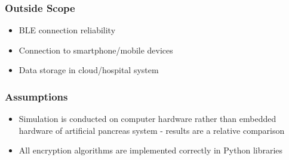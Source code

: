 \documentclass[conference]{IEEEtran}
\begin{document}
\subsubsection{Outside Scope}
\begin{itemize}
    \item BLE connection reliability
    \item Connection to smartphone/mobile devices
    \item Data storage in cloud/hospital system
\end{itemize}

\subsubsection{Assumptions}
\begin{itemize}
    \item Simulation is conducted on computer hardware rather than embedded hardware of artificial pancreas system - results are a relative comparison
    \item All encryption algorithms are implemented correctly in Python libraries
\end{itemize}
\end{document}
